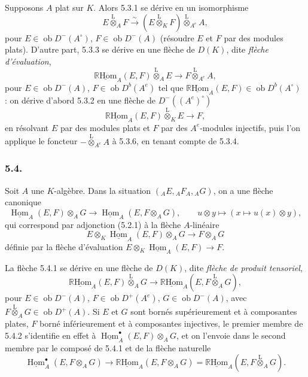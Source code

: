 \documentclass[11pt]{article}
\DeclareMathOperator{\Hom}{Hom}
\newcommand{\R}{\mathbb{R}}\newcommand{\RHomCore}{\mathbb{R}\mathrm{Hom}}
\newcommand{\ob}{\operatorname{ob}}
\providecommand{\RHom}{\RHomCore}
\providecommand{\uRHom}{\underline{\RHom}}
\providecommand{\uHom}{\underline{\Hom}}
\providecommand{\lten}{\overset{\mathrm L}{\otimes}}
\providecommand{\RHom}{\RHomCore}
\providecommand{\Hom}{\operatorname{Hom}}
\providecommand{\ob}{\operatorname{ob}}
\providecommand{\lten}{\overset{\mathrm L}{\otimes}}
\providecommand{\RHom}{\R\mathcal{H}om}
\providecommand{\lten}{\overset{\mathrm L}{\otimes}}
\providecommand{\R}{\mathrm R}
\providecommand{\lten}{\overset{\mathrm L}{\otimes}}
\providecommand{\lten}{\overset{\mathrm L}{\otimes}}
\providecommand{\lten}{\overset{\mathrm L}{\otimes}}
\providecommand{\RHom}{\RHomCore}
\providecommand{\Hom}{\operatorname{Hom}}
\providecommand{\lten}{\overset{\mathrm L}{\otimes}}
\begin{document}
Supposons $A$ plat sur $K$. Alors 5.3.1 se dérive en un isomorphisme
\begin{equation}\tag{5.3.4}
E\lten_AF\xrightarrow{\sim}(E\lten_KF)\lten_{A^e}A,
\end{equation}
pour $E\in\ob D^-(A^\circ)$, $F\in\ob D^-(A)$ (résoudre $E$ et $F$ par des modules plats). D'autre part, 5.3.3 se dérive en une flèche de $D(K)$, dite \emph{flèche d'évaluation},
\begin{equation}\tag{5.3.5}
\uRHom_A(E,F)\lten_AE\longrightarrow F\lten_{A^e}A,
\end{equation}
pour $E\in\ob D^-(A)$, $F\in\ob D^b(A^e)$ tel que $\uRHom_A(E,F)\in\ob D^b(A^\circ)$ : on dérive d'abord 5.3.2 en une flèche de $D^-((A^e)^\circ)$
\begin{equation}\tag{5.3.6}
\uRHom_A(E,F)\lten_KE\longrightarrow F,
\end{equation}
en résolvant $E$ par des modules plats et $F$ par des $A^e$-modules injectifs, puis l'on applique le foncteur $-\lten_{A^e}A$ à 5.3.6, en tenant compte de 5.3.4.

\subsubsection*{5.4.}

Soit $A$ une $K$-algèbre. Dans la situation $({}_AE,{}_AF_A,{}_AG)$, on a une flèche canonique
\begin{equation}\tag{5.4.1}
\uHom_A(E,F)\otimes_AG\longrightarrow\uHom_A(E,F\otimes_AG),
\qquad u\otimes y\longmapsto(x\longmapsto u(x)\otimes y),
\end{equation}
qui correspond par adjonction (5.2.1) à la flèche $A$-linéaire
\[
E\otimes_K\uHom_A(E,F)\otimes_AG\longrightarrow F\otimes_AG
\]
définie par la flèche d'évaluation $E\otimes_K\uHom_A(E,F)\to F$.

La flèche 5.4.1 se dérive en une flèche de $D(K)$, dite \emph{flèche de produit tensoriel},
\begin{equation}\tag{5.4.2}
\uRHom_A(E,F)\lten_AG\longrightarrow\uRHom_A(E,F\lten_AG),
\end{equation}
pour $E\in\ob D^-(A)$, $F\in\ob D^+(A^e)$, $G\in\ob D^-(A)$, avec $F\lten_AG\in\ob D^+(A)$. Si $E$ et $G$ sont bornés supérieurement et à composantes plates, $F$ borné inférieurement et à composantes injectives, le premier membre de 5.4.2 s'identifie en effet à $\uHom_A^\bullet(E,F)\otimes_AG$, et on l'envoie dans le second membre par le composé de 5.4.1 et de la flèche naturelle
\[
\uHom_A^\bullet(E,F\otimes_AG)\longrightarrow \uRHom_A(E,F\otimes_AG)=\uRHom_A(E,F\lten_AG).
\]
\end{document}
